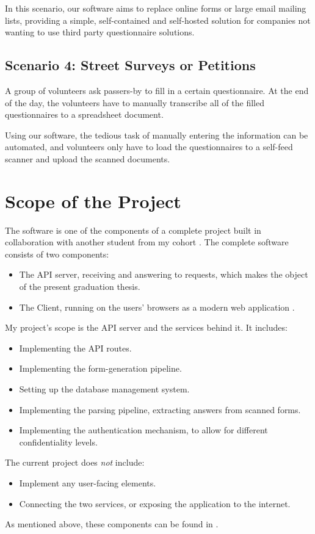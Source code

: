 \documentclass[11pt, a4paper]{report}
\begin{document}
In this scenario, our software aims to replace online forms or large email mailing lists, providing a simple, self-contained and self-hosted solution for companies not wanting to use third party questionnaire solutions.

\subsection*{Scenario 4: Street Surveys or Petitions}

A group of volunteers ask passers-by to fill in a certain questionnaire. At the end of the day, the volunteers have to manually transcribe all of the filled questionnaires to a spreadsheet document.

Using our software, the tedious task of manually entering the information can be automated, and volunteers only have to load the questionnaires to a self-feed scanner and upload the scanned documents.

\section{Scope of the Project}

The software is one of the components of a complete project built in collaboration with another student from my cohort \cite{felix}.
The complete software consists of two components:
\begin{itemize}
    \item The API server, receiving and answering to requests, which makes the object of the present graduation thesis.
    \item The Client, running on the users' browsers as a modern web application \cite{felix}.
\end{itemize}
My project's scope is the API server and the services behind it. It includes:
\begin{itemize}
    \item Implementing the API routes.
    \item Implementing the form-generation pipeline.
    \item Setting up the database management system.
    \item Implementing the parsing pipeline, extracting answers from scanned forms.
    \item Implementing the authentication mechanism, to allow for different confidentiality levels.
\end{itemize}
The current project does \emph{not} include:
\begin{itemize}
    \item Implement any user-facing elements.
    \item Connecting the two services, or exposing the application to the internet.
\end{itemize}
As mentioned above, these components can be found in \cite{felix}.
\end{document}
